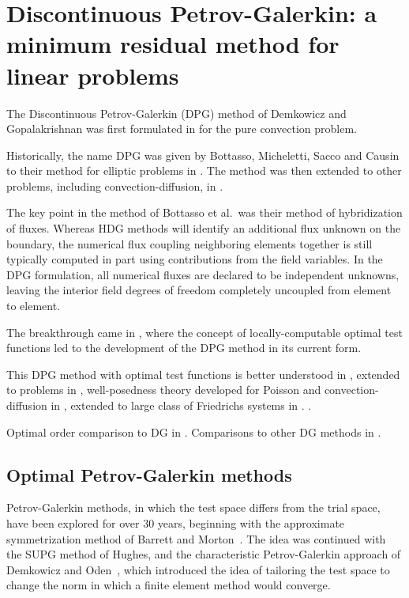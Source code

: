 \documentclass{report}
\newcommand{\seclab}[1]{\label{sec:#1}}
\begin{document}
\chapter{Discontinuous Petrov-Galerkin: a minimum residual method for linear problems}

The Discontinuous Petrov-Galerkin (DPG) method of Demkowicz and Gopalakrishnan was first formulated in \cite{DPG1} for the pure convection problem. 

Historically, the name DPG was given by Bottasso, Micheletti, Sacco and Causin to their method for elliptic problems in \cite{BottassoMichelettiSacco02}. The method was then extended to other problems, including convection-diffusion, in \cite{BottassoMichelettiSacco05,CausinSacco05,CausinSaccoBottasso05}. 

The key point in the method of Bottasso et al.\ was their method of hybridization of fluxes. Whereas HDG methods will identify an additional flux unknown on the boundary, the numerical flux coupling neighboring elements together is still typically computed in part using contributions from the field variables. In the DPG formulation, all numerical fluxes are declared to be independent unknowns, leaving the interior field degrees of freedom completely uncoupled from element to element. 

The breakthrough came in \cite{DPG2}, where the concept of locally-computable optimal test functions led to the development of the DPG method in its current form.

This DPG method with optimal test functions is better understood in \cite{DPG3,DPG4}, extended to problems in \cite{DPGElas,stokesDPG}, well-posedness theory developed for Poisson and convection-diffusion in \cite{analysisDPG}, extended to large class of Friedrichs systems in \cite{Bui-ThanhDemkowiczGhattas11b}. \cite{practicalDPG}. 

Optimal order comparison to DG in \cite{DPG1}. Comparisons to other DG methods in \cite{Bui-ThanhDemkowiczGhattas11a,DGDPG}.

\section{Optimal Petrov-Galerkin methods}

\seclab{optimalTest} Petrov-Galerkin methods, in which the test space differs from the trial space, have been explored for over 30 years, beginning with the approximate symmetrization method of Barrett and
Morton~\cite{BARRETT01101981}. The idea was continued with the SUPG method of Hughes, and the characteristic Petrov-Galerkin approach of Demkowicz and Oden~\cite{Demkowicz1986188}, which introduced the
idea of tailoring the test space to change the norm in which a finite element method would converge.
\end{document}
